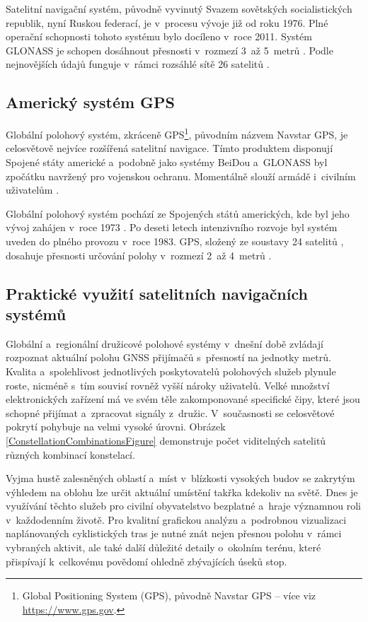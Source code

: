 Satelitní navigační systém, původně vyvinutý Svazem sovětských socialistických republik, nyní Ruskou federací, je v~procesu vývoje již od roku 1976.
Plné operační schopnosti tohoto systému bylo docíleno v~roce 2011.
Systém GLONASS je schopen dosáhnout přesnosti v~rozmezí 3~až 5~metrů \cite{SpaceFinland2023}.
Podle nejnovějších údajů funguje v~rámci rozsáhlé sítě 26 satelitů \cite{CDDIS2024}.

\subsection{Americký systém GPS}
\label{american-gps-system}

Globální polohový systém, zkráceně GPS\footnote{Global Positioning System (GPS), původně Navstar GPS -- více viz \url{https://www.gps.gov}.}, původním názvem Navstar GPS, je celosvětově nejvíce rozšířená satelitní navigace.
Tímto produktem disponují Spojené státy americké a~podobně jako systémy BeiDou a~GLONASS byl zpočátku navržený pro vojenskou ochranu.
Momentálně slouží armádě i~civilním uživatelům \cite{MortonYuJ2021}.

Globální polohový systém pochází ze Spojených států amerických, kde byl jeho vývoj zahájen v~roce 1973 \cite{KaplanElliottD2017}.
Po deseti letech intenzivního rozvoje byl systém uveden do plného provozu v~roce 1983.
GPS, složený ze soustavy 24 satelitů \cite{CDDIS2024}, dosahuje přesnosti určování polohy v~rozmezí 2~až 4~metrů \cite{SpaceFinland2023}.

\subsection{Praktické využití satelitních navigačních systémů}

Globální a~regionální družicové polohové systémy v~dnešní době zvládají rozpoznat aktuální polohu GNSS přijímačů s~přesností na jednotky metrů.
Kvalita a~spolehlivost jednotlivých poskytovatelů polohových služeb plynule roste, nicméně s~tím souvisí rovněž vyšší nároky uživatelů.
Velké množství elektronických zařízení má ve svém těle zakomponované specifické čipy, které jsou schopné přijímat a~zpracovat signály z~družic.
V~současnosti se celosvětové pokrytí pohybuje na velmi vysoké úrovni.
Obrázek \ref{ConstellationCombinationsFigure} demonstruje počet viditelných satelitů různých kombinací konstelací.

Vyjma hustě zalesněných oblastí a~míst v~blízkosti vysokých budov se zakrytým výhledem na oblohu lze určit aktuální umístění takřka kdekoliv na světě.
Dnes je využívání těchto služeb pro civilní obyvatelstvo bezplatné a~hraje významnou roli v~každodenním životě.
Pro kvalitní grafickou analýzu a~podrobnou vizualizaci naplánovaných cyklistických tras je nutné znát nejen přesnou polohu v~rámci vybraných aktivit, ale také další důležité detaily o~okolním terénu, které přispívají k~celkovému povědomí ohledně zbývajících úseků stop.

